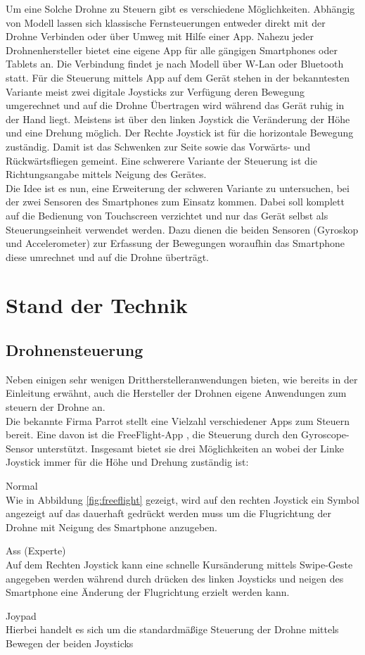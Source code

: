\documentclass{article}
\begin{document}
Um eine Solche Drohne zu Steuern gibt es verschiedene Möglichkeiten. Abhängig von Modell lassen sich klassische Fernsteuerungen\cite{flypad} entweder direkt mit der Drohne Verbinden oder über Umweg mit Hilfe einer App. Nahezu jeder Drohnenhersteller bietet eine eigene App für alle gängigen Smartphones oder Tablets an. Die Verbindung findet je nach Modell über W-Lan oder Bluetooth statt. Für die Steuerung mittels App auf dem Gerät stehen in der bekanntesten Variante meist zwei digitale Joysticks zur Verfügung deren Bewegung umgerechnet und auf die Drohne Übertragen wird während das Gerät ruhig in der Hand liegt. Meistens ist über den linken Joystick die Veränderung der Höhe und eine Drehung möglich. Der Rechte Joystick ist für die horizontale Bewegung zuständig. Damit ist das Schwenken zur Seite sowie das Vorwärts- und Rückwärtsfliegen gemeint. Eine schwerere Variante der Steuerung ist die Richtungsangabe mittels Neigung des Gerätes.
\\ Die Idee ist es nun, eine Erweiterung der schweren Variante zu untersuchen, bei der zwei Sensoren des Smartphones zum Einsatz kommen. Dabei soll komplett auf die Bedienung von Touchscreen verzichtet und nur das Gerät selbst als Steuerungseinheit verwendet werden. Dazu dienen die beiden Sensoren (Gyroskop und Accelerometer) zur Erfassung der Bewegungen woraufhin das Smartphone diese umrechnet und auf die Drohne überträgt. 

\section{Stand der Technik}
\label{sec:verwandteArbeiten}
\subsection{Drohnensteuerung}
Neben einigen sehr wenigen Drittherstelleranwendungen bieten, wie bereits in der Einleitung erwähnt, auch die Hersteller der Drohnen eigene Anwendungen zum steuern der Drohne an.
\\ Die bekannte Firma Parrot stellt eine Vielzahl verschiedener Apps zum Steuern bereit. Eine davon ist die FreeFlight-App \cite{freeflightapp}, die Steuerung durch den Gyroscope-Sensor unterstützt. Insgesamt bietet sie drei Möglichkeiten an wobei der Linke Joystick immer für die Höhe und Drehung zuständig ist:
\begin{description}
\item Normal \\
Wie in Abbildung \ref{fig:freeflight} gezeigt, wird auf den rechten Joystick ein Symbol angezeigt auf das dauerhaft gedrückt werden muss um die Flugrichtung der Drohne mit Neigung des Smartphone anzugeben.  
\item Ass (Experte) \\ 
Auf dem Rechten Joystick kann eine schnelle Kursänderung mittels Swipe-Geste angegeben werden während durch drücken des linken Joysticks und neigen des Smartphone eine Änderung der Flugrichtung erzielt werden kann. 
\item Joypad\\
Hierbei handelt es sich um die standardmäßige Steuerung der Drohne mittels Bewegen der beiden Joysticks
\end{description}
\end{document}
